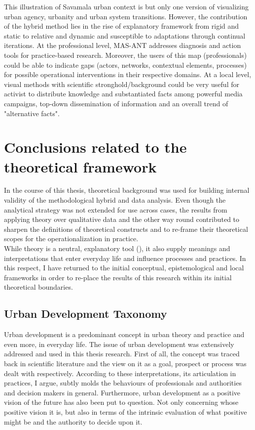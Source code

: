 \documentclass[11pt]{report}
\begin{document}
{{{This illustration of Savamala urban context is but only one version of visualizing urban agency, urbanity and urban system transitions.
However, the contribution of the hybrid method lies in the rise of explanatory framework from rigid and static to relative and dynamic and susceptible to adaptations through continual iterations.
At the professional level, MAS-ANT addresses diagnosis and action tools for practice-based research.
Moreover, the users of this map (professionals) could be able to indicate gaps (actors, networks, contextual elements, processes) for possible operational interventions in their respective domains.
At a local level, visual methods with scientific stronghold/background could be very useful for activist to distribute knowledge and substantiated facts among powerful media campaigns, top-down dissemination of information and an overall trend of "alternative facts".

\section{Conclusions related to the theoretical framework}

In the course of this thesis, theoretical background was used for building internal validity of the methodological hybrid and data analysis.
Even though the analytical strategy was not extended for use across cases, the results from applying theory over qualitative data and the other way round contributed to sharpen the definitions of theoretical constructs and to re-frame their theoretical scopes for the operationalization in practice.
\\

While theory is a neutral, explanatory tool (\href{Sears}{\citealt{sears_good_2005}}), it also supply meanings and interpretations that enter everyday life and influence processes and practices.
In this respect, I have returned to the initial conceptual, epistemological and local frameworks in order to re-place the results of this research within its initial theoretical boundaries.

\subsection{Urban Development Taxonomy}

Urban development is a predominant concept in urban theory and practice and even more, in everyday life.
The issue of urban development was extensively addressed and used in this thesis research.
First of all, the concept was traced back in scientific literature and the view on it as a goal, prospect or process was dealt with respectively.
According to these interpretations, its articulation in practices, I argue, subtly molds the behaviours of professionals and authorities and decision makers in general.
Furthermore, urban development as a positive vision of the future has also been put to question.
Not only concerning whose positive vision it is, but also in terms of the intrinsic evaluation of what positive might be and the authority to decide upon it.
\\

}}}
\end{document}
